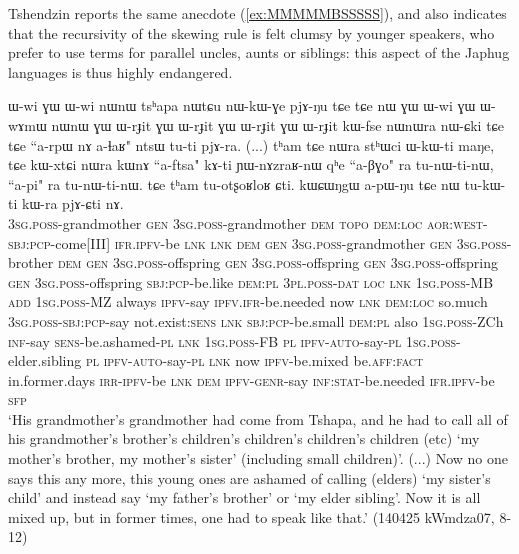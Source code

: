 Tshendzin reports the same anecdote (\ref{ex:MMMMMBSSSSS}), and also indicates that the recursivity of the skewing rule is felt clumsy by younger speakers, who prefer to use terms for parallel uncles, aunts or siblings: this aspect of the Japhug languages is thus highly endangered.
 
 \begin{exe}
\ex \label{ex:MMMMMBSSSSS}
\gll  ɯ-wi ɣɯ ɯ-wi nɯnɯ tsʰapa nɯtɕu nɯ-kɯ-ɣe pjɤ-ŋu tɕe tɕe nɯ ɣɯ ɯ-wi ɣɯ ɯ-wɤmɯ nɯnɯ ɣɯ ɯ-rɟit ɣɯ ɯ-rɟit ɣɯ ɯ-rɟit ɣɯ ɯ-rɟit kɯ-fse nɯnɯra nɯ-ɕki tɕe tɕe ``a-rpɯ nɤ a-ɬaʁ" ntsɯ tu-ti pjɤ-ra. (...) tʰam tɕe nɯra stʰɯci ɯ-kɯ-ti maŋe, tɕe kɯ-xtɕi nɯra kɯnɤ ``a-ftsa" kɤ-ti ɲɯ-nɤzraʁ-nɯ qʰe ``a-βɣo" ra tu-nɯ-ti-nɯ,  ``a-pi" ra tu-nɯ-ti-nɯ. tɕe tʰam tu-otʂoʁloʁ ɕti. kɯɕɯŋgɯ a-pɯ-ŋu tɕe nɯ tu-kɯ-ti kɯ-ra pjɤ-ɕti nɤ. \\
  \textsc{3sg}.\textsc{poss}-grandmother \textsc{gen}   \textsc{3sg}.\textsc{poss}-grandmother \textsc{dem}   \textsc{topo} \textsc{dem}:\textsc{loc} \textsc{aor}:\textsc{west}-\textsc{sbj}:\textsc{pcp}-come[III] \textsc{ifr}.\textsc{ipfv}-be \textsc{lnk} \textsc{lnk} \textsc{dem} \textsc{gen} \textsc{3sg}.\textsc{poss}-grandmother \textsc{gen} \textsc{3sg}.\textsc{poss}-brother \textsc{dem} \textsc{gen} \textsc{3sg}.\textsc{poss}-offspring  \textsc{gen} \textsc{3sg}.\textsc{poss}-offspring  \textsc{gen} \textsc{3sg}.\textsc{poss}-offspring  \textsc{gen} \textsc{3sg}.\textsc{poss}-offspring \textsc{sbj}:\textsc{pcp}-be.like \textsc{dem}:\textsc{pl} \textsc{3pl}.\textsc{poss}-\textsc{dat} \textsc{loc} \textsc{lnk} \textsc{1sg}.\textsc{poss}-MB \textsc{add} \textsc{1sg}.\textsc{poss}-MZ always \textsc{ipfv}-say \textsc{ipfv}.\textsc{ifr}-be.needed {  } now \textsc{lnk} \textsc{dem}:\textsc{loc} so.much \textsc{3sg}.\textsc{poss}-\textsc{sbj}:\textsc{pcp}-say not.exist:\textsc{sens} \textsc{lnk} \textsc{sbj}:\textsc{pcp}-be.small \textsc{dem}:\textsc{pl} also \textsc{1sg}.\textsc{poss}-ZCh \textsc{inf}-say \textsc{sens}-be.ashamed-\textsc{pl} \textsc{lnk} \textsc{1sg}.\textsc{poss}-FB \textsc{pl} \textsc{ipfv}-\textsc{auto}-say-\textsc{pl} \textsc{1sg}.\textsc{poss}-elder.sibling \textsc{pl} \textsc{ipfv}-\textsc{auto}-say-\textsc{pl}  \textsc{lnk} now \textsc{ipfv}-be.mixed be.\textsc{aff}:\textsc{fact} in.former.days \textsc{irr}-\textsc{ipfv}-be \textsc{lnk} \textsc{dem} \textsc{ipfv}-\textsc{genr}-say \textsc{inf}:\textsc{stat}-be.needed \textsc{ifr}.\textsc{ipfv}-be \textsc{sfp} \\
 \glt `His grandmother's grandmother had come from Tshapa, and he had to call all of his grandmother's brother's children's children's children's children (etc) `my mother's brother, my mother's sister' (including small children)'. (...) Now no one says this any more, this young ones are ashamed of calling (elders) `my sister's child' and instead say `my father's brother' or `my elder sibling'. Now it is all mixed up, but in former times, one had to speak like that.' (140425 kWmdza07, 8-12)
 \end{exe}
 
